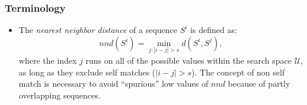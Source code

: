 \documentclass[a4paper,twoside]{article}
\begin{document}
\subsubsection{Terminology}\label{sssec:term}
%
\begin{itemize}
\item  The \textit{nearest neighbor distance} of a sequence $S^i$ is defined as:
\begin{equation}
 nnd(S^i)=   \min_{j:|i-j|>s} d({S^i},{S^j}),
\end{equation}
where the index $j$ runs on all of the possible values within the search space $\mathcal{U}$, as long as they exclude self matches ($|i-j|>s$).
%
% 
%
%
%
The concept of non self match \cite{hotsax} is necessary to avoid ``spurious'' low values of $nnd$ because of partly overlapping sequences. 
%
%



%


\end{itemize}
\end{document}
